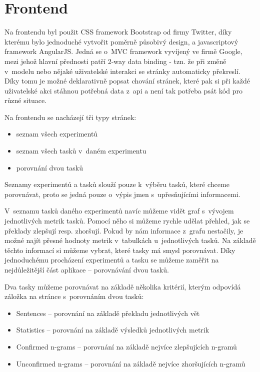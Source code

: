\section{Frontend}
Na frontendu byl použit CSS framework Bootstrap od firmy Twitter,
  díky kterému bylo jednoduché vytvořit poměrně působivý design,
  a javascriptový framework AngularJS.
Jedná se o~MVC framework vyvíjený ve firmě Google,
  mezi jehož hlavní přednosti patří 2-way data binding -
  tzn. že při změně v~modelu nebo nějaké uživatelské interakci se stránky automaticky překreslí.
Díky tomu je možné deklarativně popsat chování stránek,
  které pak si při každé uživatelské akci stáhnou potřebná data z~api
  a není tak potřeba psát kód pro různé situace.

Na frontendu se nacházejí tři typy stránek:
\begin{itemize}
  \item seznam všech experimentů
  \item seznam všech tasků v~daném experimentu
  \item porovnání dvou tasků
\end{itemize}

Seznamy experimentů a tasků slouží pouze k~výběru tasků,
  které chceme porovnávat,
  proto se jedná pouze o~výpis jmen s~upřesňujícími informacemi.

V~seznamu tasků daného experimentů navíc můžeme vidět graf s~vývojem jednotlivých metrik tasků.
Pomocí něho si můžeme rychle udělat přehled,
  jak se překlady zlepšují resp. zhoršují.
Pokud by nám informace z~grafu nestačily,
  je možné najít přesné hodnoty metrik v~tabulkách u~jednotlivých tasků.
Na základě těchto informací si můžeme vybrat,
  které tasky má smysl porovnávat.
Díky jednoduchému procházení experimentů a tasku se můžeme zaměřit na nejdůležitější část aplikace
  -- porovnávání dvou tasků.

Dva tasky můžeme porovnávat na základě několika kritérií,
  kterým odpovídá záložka na stránce s~porovnáním dvou tasků:
\begin{itemize}
  \item Sentences -- porovnání na základě překladu jednotlivých vět
  \item Statistics -- porovnání na základě výsledků jednotlivých metrik
  \item Confirmed n-grams -- porovnání na základě nejvíce zlepšujících n-gramů
  \item Unconfirmed n-grams -- porovnání na základě nejvíce zhoršujících n-gramů
\end{itemize}

